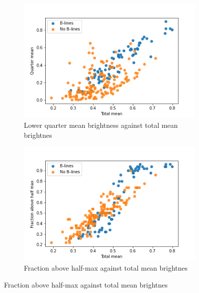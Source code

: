 \documentclass[12pt]{article} %
\begin{document}
	\begin{figure}
	\centering
		\begin{subfigure}{0.65\textwidth}
		\centering
		\includegraphics[width=\textwidth]{figuras/scores1_2.png}
		\caption{Lower quarter mean brightness against total mean brightnes}
		\end{subfigure}

		\begin{subfigure}{0.65\textwidth}
		\centering
		\includegraphics[width=\textwidth]{figuras/scores1_3.png}
		\caption{Fraction above half-max against total mean brightnes}
		\end{subfigure}


\end{figure}
\end{document}
